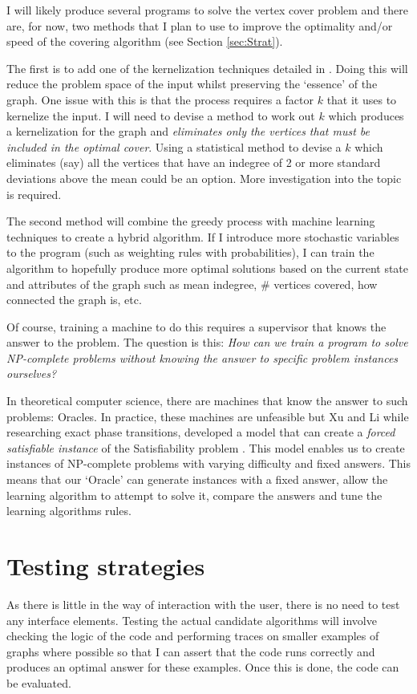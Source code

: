 \documentclass[11pt]{article}
\theoremstyle{definition}
\begin{document}
      I will likely produce several programs to solve the vertex cover problem and
      there are, for now, two methods that I plan to use to improve the optimality and/or speed of the covering algorithm
      (see Section \ref{sec:Strat}).

      The first is to add one of the kernelization techniques detailed
      in \cite{paper:KernelIntro}. Doing this will reduce the problem space of the input whilst
      preserving the `essence' of the graph. One issue with this is that the process requires a factor
      $k$ that it uses to kernelize the input. I will need to devise a method to work out $k$ which 
      produces a kernelization for the graph and \emph{eliminates only the vertices that must be 
      included in the optimal cover}. Using a statistical method to devise a $k$ which eliminates (say) 
      all the vertices that have an indegree of 2 or more standard deviations above the mean could be an option. More
      investigation into the topic is required.

      The second method will combine
      the greedy process with machine learning techniques to create a hybrid algorithm. If I introduce
      more stochastic variables to the program (such as weighting rules with probabilities), I can train
      the algorithm to hopefully produce more optimal solutions based on the current state and attributes of the graph
      such as mean indegree, \# vertices covered, how connected the graph is, etc.
 
      Of course, training a machine to do this requires a supervisor that knows the answer to the problem.
      The question is this: \emph{How can we train a program to solve NP-complete problems without knowing the
      answer to specific problem instances ourselves?}

      In theoretical computer science, there are machines that know the answer to such problems: Oracles.
      In practice, these machines are unfeasible but Xu and Li while researching
      exact phase transitions, developed a model that can create a \emph{forced satisfiable instance} of
      the Satisfiability problem \cite{Xu:Transitions}.
      This model enables us to create instances of NP-complete problems with
      varying difficulty and fixed answers. This means that our `Oracle' can generate instances with a fixed
      answer, allow the learning algorithm to attempt to solve it, compare the answers and tune the learning
      algorithms rules.
 
  \section{Testing strategies}
    As there is little in the way of interaction with the user, there is no need to test any interface elements.
    Testing the actual candidate algorithms will involve checking the logic of the code and performing traces
    on smaller examples of graphs where possible so that I can assert that the code runs correctly and produces
    an optimal answer for these examples. Once this is done, the code can be evaluated. 
\end{document}
